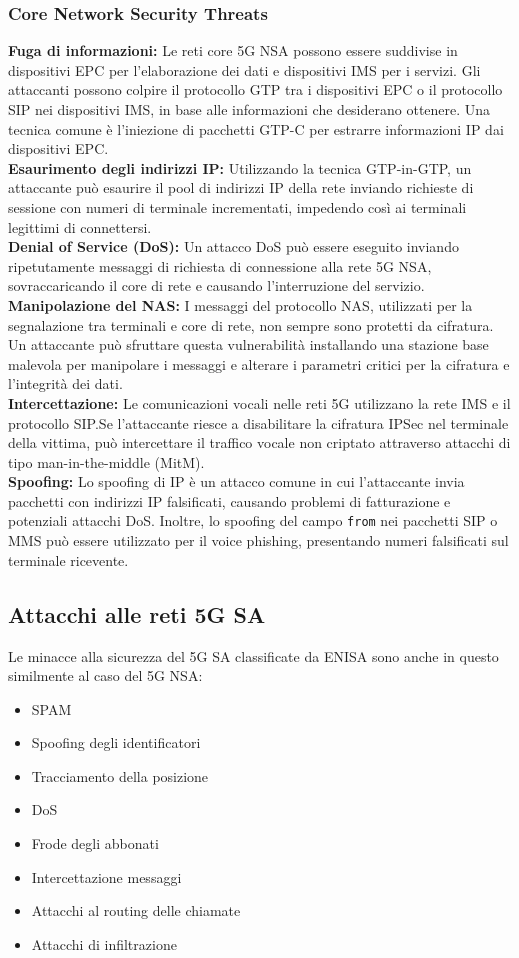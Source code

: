 \documentclass[english]{article}
\begin{document}
\subsubsection{Core Network Security Threats}
\textbf{Fuga di informazioni:} Le reti core 5G NSA possono essere suddivise in dispositivi
EPC per l'elaborazione dei dati e dispositivi IMS per i servizi.
Gli attaccanti possono colpire il protocollo GTP tra i dispositivi EPC o il protocollo SIP
nei dispositivi IMS, in base alle informazioni che desiderano ottenere. Una tecnica comune
è l'iniezione di pacchetti GTP-C per estrarre informazioni IP dai dispositivi EPC.\@
\\
\textbf{Esaurimento degli indirizzi IP:} Utilizzando la tecnica GTP-in-GTP, un attaccante
può esaurire il pool di indirizzi IP della rete inviando richieste di sessione con numeri
di terminale incrementati, impedendo così ai terminali legittimi di connettersi.
\\
\textbf{Denial of Service (DoS):} Un attacco DoS può essere eseguito inviando ripetutamente
messaggi di richiesta di connessione alla rete 5G NSA, sovraccaricando il core di rete e
causando l'interruzione del servizio.
\\
\textbf{Manipolazione del NAS:} I messaggi del protocollo NAS, utilizzati per la segnalazione
tra terminali e core di rete, non sempre sono protetti da cifratura. Un attaccante può
sfruttare questa vulnerabilità installando una stazione base malevola per manipolare i
messaggi e alterare i parametri critici per la cifratura e l'integrità dei dati.
\\
\textbf{Intercettazione:} Le comunicazioni vocali nelle reti 5G utilizzano la rete IMS e
il protocollo SIP.\@ Se l'attaccante riesce a disabilitare la cifratura IPSec nel terminale
della vittima, può intercettare il traffico vocale non criptato attraverso attacchi di
tipo man-in-the-middle (MitM).
\\
\textbf{Spoofing:} Lo spoofing di IP è un attacco comune in cui l'attaccante invia pacchetti
con indirizzi IP falsificati, causando problemi di fatturazione e potenziali attacchi DoS.
Inoltre, lo spoofing del campo \texttt{from} nei pacchetti SIP o MMS può essere utilizzato
per il voice phishing, presentando numeri falsificati sul terminale ricevente.

\subsection{Attacchi alle reti 5G SA}
Le minacce alla sicurezza del 5G SA classificate da ENISA sono anche in questo
similmente al caso del 5G NSA:\@
\begin{itemize}
	\item SPAM
	\item Spoofing degli identificatori
	\item Tracciamento della posizione
	\item DoS
	\item Frode degli abbonati
	\item Intercettazione messaggi
	\item Attacchi al routing delle chiamate
	\item Attacchi di infiltrazione
\end{itemize}
\end{document}
